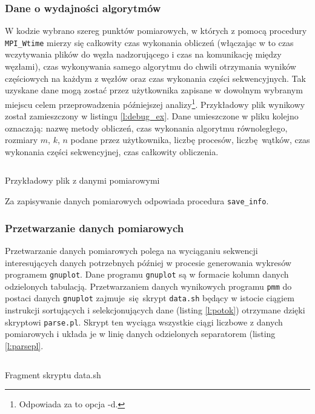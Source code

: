 \subsubsection{Dane o wydajności algorytmów}
W kodzie wybrano szereg punktów pomiarowych, w których z pomocą procedury \texttt{MPI\_Wtime} mierzy się całkowity czas wykonania obliczeń (włączając w to czas wczytywania plików do węzła nadzorującego i czas na komunikację między węzłami), czas wykonywania samego algorytmu do chwili otrzymania wyników częściowych na każdym z węzłów oraz czas wykonania części sekwencyjnych. Tak uzyskane dane mogą zostać przez użytkownika zapisane w dowolnym wybranym miejscu celem przeprowadzenia późniejszej analizy\footnote{Odpowiada za to opcja -d.}. Przykładowy plik wynikowy został zamieszczony w listingu \ref{l:debug_ex}. Dane umieszczone w pliku kolejno oznaczają: nazwę metody obliczeń, czas wykonania algorytmu równoległego, rozmiary \(m\), \(k\), \(n\) podane przez użytkownika, liczbę procesów, liczbę wątków, czas wykonania części sekwencyjnej, czas całkowity obliczenia.

\begin{listing}
\inputminted[fontsize=\footnotesize,bgcolor=bg,breaklines]{c}{includes/listings/debug_1441565169}
\caption{Przykładowy plik z danymi pomiarowymi}
\label{l:debug_ex}
\end{listing}

\noindent Za zapisywanie danych pomiarowych odpowiada procedura \texttt{save\_info}.

\subsubsection{Przetwarzanie danych pomiarowych}
Przetwarzanie danych pomiarowych polega na wyciąganiu sekwencji interesujących danych potrzebnych później w procesie generowania wykresów programem \texttt{gnuplot}. Dane programu \texttt{gnuplot} są w formacie kolumn danych odzielonych tabulacją. Przetwarzaniem danych wynikowych programu \texttt{pmm} do postaci danych \texttt{gnuplot} zajmuje się skrypt \texttt{data.sh} będący w istocie ciągiem instrukcji sortujących i selekcjonujących dane (listing \ref{l:potok}) otrzymane dzięki skryptowi \texttt{parse.pl}. Skrypt ten wyciąga wszystkie ciągi liczbowe z danych pomiarowych i układa je w linię danych odzielonych separatorem (listing \ref{l:parsepl}.

\begin{listing}[H]
\inputminted[fontsize=\footnotesize,bgcolor=bg,linenos,firstnumber=4,firstline=4,lastline=9,breaklines]{bash}{includes/listings/data.sh}
\caption{Fragment skryptu data.sh}
\label{l:collecting_cannon}
\end{listing}

